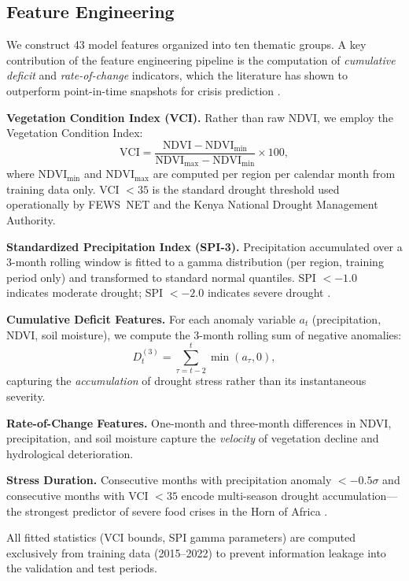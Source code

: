 \documentclass[11pt,letterpaper]{article}
\begin{document}
\subsection{Feature Engineering}

We construct 43 model features organized into ten thematic groups. A key contribution of the feature engineering pipeline is the computation of \emph{cumulative deficit} and \emph{rate-of-change} indicators, which the literature has shown to outperform point-in-time snapshots for crisis prediction \citep{funk2015, westerveld2021}.

\textbf{Vegetation Condition Index (VCI).} Rather than raw NDVI, we employ the Vegetation Condition Index:
\[
  \text{VCI} = \frac{\text{NDVI} - \text{NDVI}_{\min}}{\text{NDVI}_{\max} - \text{NDVI}_{\min}} \times 100,
\]
where $\text{NDVI}_{\min}$ and $\text{NDVI}_{\max}$ are computed per region per calendar month from training data only. VCI $< 35$ is the standard drought threshold used operationally by FEWS~NET and the Kenya National Drought Management Authority.

\textbf{Standardized Precipitation Index (SPI-3).} Precipitation accumulated over a 3-month rolling window is fitted to a gamma distribution (per region, training period only) and transformed to standard normal quantiles. SPI $< -1.0$ indicates moderate drought; SPI $< -2.0$ indicates severe drought \citep{vicente2010}.

\textbf{Cumulative Deficit Features.} For each anomaly variable $a_t$ (precipitation, NDVI, soil moisture), we compute the 3-month rolling sum of negative anomalies:
\[
  D_t^{(3)} = \sum_{\tau=t-2}^{t} \min(a_\tau, 0),
\]
capturing the \emph{accumulation} of drought stress rather than its instantaneous severity.

\textbf{Rate-of-Change Features.} One-month and three-month differences in NDVI, precipitation, and soil moisture capture the \emph{velocity} of vegetation decline and hydrological deterioration.

\textbf{Stress Duration.} Consecutive months with precipitation anomaly $< -0.5\sigma$ and consecutive months with VCI $< 35$ encode multi-season drought accumulation---the strongest predictor of severe food crises in the Horn of Africa \citep{funk2015}.

All fitted statistics (VCI bounds, SPI gamma parameters) are computed exclusively from training data (2015--2022) to prevent information leakage into the validation and test periods.


\end{document}
